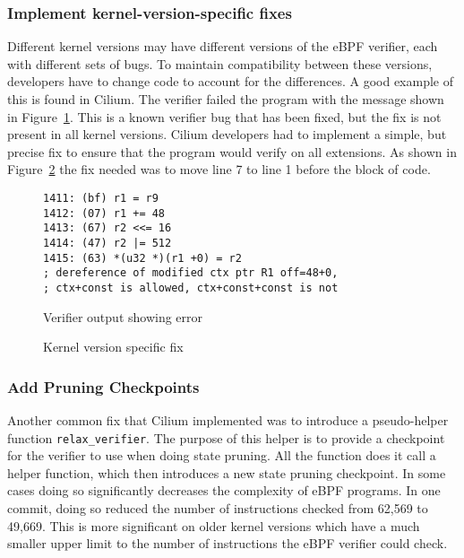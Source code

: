 \subsubsection{Implement kernel-version-specific fixes}
\label{motivation:kernel-version}
Different kernel versions may have different versions of the eBPF verifier, each with different sets of bugs.
To maintain compatibility between these versions, developers have to change code to account for the differences.
A good example of this is found in Cilium.
The verifier failed the program with the message shown in Figure~\ref{fig:kernel-version}.
This is a known verifier bug that has been fixed, but the fix is not present in all kernel versions.
Cilium developers had to implement a simple, but precise fix to ensure that the program would verify on all extensions.
As shown in Figure~\ref{fig:kernel-version-code} the fix needed was to move line 7 to line 1 before the block of code.

\begin{figure}
    \begin{lstlisting}[language=myBPF]
1411: (bf) r1 = r9
1412: (07) r1 += 48
1413: (67) r2 <<= 16
1414: (47) r2 |= 512
1415: (63) *(u32 *)(r1 +0) = r2
; dereference of modified ctx ptr R1 off=48+0,
; ctx+const is allowed, ctx+const+const is not
    \end{lstlisting}
    \caption{Verifier output showing error}
    \label{fig:kernel-version}
\end{figure}

\begin{figure}
    
    \caption{Kernel version specific fix}
    \label{fig:kernel-version-code}
\end{figure}

\subsubsection{Add Pruning Checkpoints}
\label{motivation:checkpoint}
Another common fix that Cilium implemented was to introduce a pseudo-helper function \texttt{relax\_verifier}.
The purpose of this helper is to provide a checkpoint for the verifier to use when doing state pruning.
All the function does it call a helper function, which then introduces a new state pruning checkpoint.
In some cases doing so significantly decreases the complexity of eBPF programs.
In one commit, doing so reduced the number of instructions checked from 62,569 to 49,669.
This is more significant on older kernel versions which have a much smaller upper limit to the number of instructions the eBPF verifier could check.

